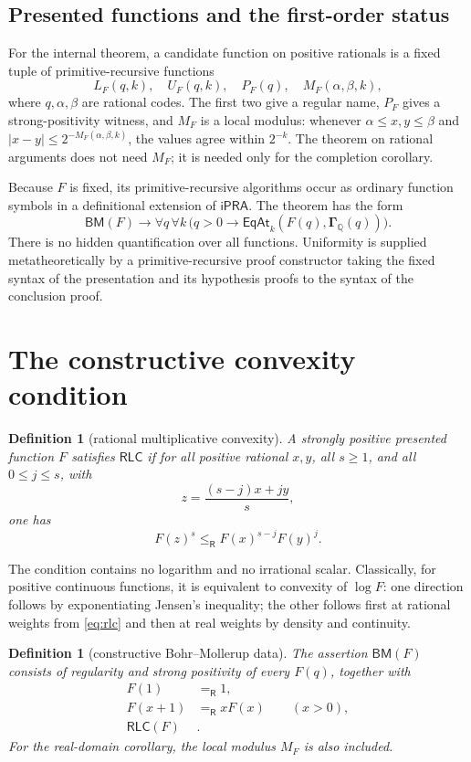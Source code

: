 \documentclass[11pt]{article}
\newtheorem{definition}[theorem]{Definition}
\newcommand{\Q}{\mathbb Q}
\newcommand{\ipra}{\mathsf{iPRA}}
\newcommand{\Gam}{\boldsymbol\Gamma}
\newcommand{\Eq}{\mathrel{=_{\!\mathsf R}}}
\newcommand{\Le}{\mathrel{\le_{\!\mathsf R}}}
\newcommand{\RLC}{\mathsf{RLC}}
\newcommand{\BM}{\mathsf{BM}}
\newcommand{\abs}[1]{\left|#1\right|}
\begin{document}
\subsection{Presented functions and the first-order status}

For the internal theorem, a candidate function on positive rationals is a
fixed tuple of primitive-recursive functions
\[
 L_F(q,k),\quad U_F(q,k),\quad P_F(q),\quad M_F(\alpha,\beta,k),
\]
where $q,\alpha,\beta$ are rational codes.  The first two give a regular name,
$P_F$ gives a strong-positivity witness, and $M_F$ is a local modulus:
whenever $\alpha\le x,y\le\beta$ and
$\abs{x-y}\le2^{-M_F(\alpha,\beta,k)}$, the values agree within $2^{-k}$.
The theorem on rational arguments does not need $M_F$; it is needed only for
the completion corollary.

Because $F$ is fixed, its primitive-recursive algorithms occur as ordinary
function symbols in a definitional extension of $\ipra$.  The theorem has the
form
\[
 \BM(F)\longrightarrow
 \forall q\,\forall k\,
 \bigl(q>0\longrightarrow \mathsf{EqAt}_k(F(q),\Gam_{\Q}(q))\bigr).
 \label{eq:schema-shape}
\]
There is no hidden quantification over all functions.  Uniformity is supplied
metatheoretically by a primitive-recursive proof constructor taking the fixed
syntax of the presentation and its hypothesis proofs to the syntax of the
conclusion proof.

\section{The constructive convexity condition}

\begin{definition}[rational multiplicative convexity]
A strongly positive presented function $F$ satisfies $\RLC$ if for all
positive rational $x,y$, all $s\ge1$, and all $0\le j\le s$, with
\[
 z=\frac{(s-j)x+jy}{s},
\]
one has
\begin{equation}
 F(z)^s\Le F(x)^{s-j}F(y)^j.
 \label{eq:rlc}
\end{equation}
\end{definition}

The condition contains no logarithm and no irrational scalar.  Classically,
for positive continuous functions, it is equivalent to convexity of
$\log F$: one direction follows by exponentiating Jensen's inequality; the
other follows first at rational weights from \eqref{eq:rlc} and then at real
weights by density and continuity.

\begin{definition}[constructive Bohr--Mollerup data]
The assertion $\BM(F)$ consists of regularity and strong positivity of every
$F(q)$, together with
\begin{align}
 F(1)&\Eq1, \label{eq:normalization}\\
 F(x+1)&\Eq xF(x) \qquad(x>0), \label{eq:recurrence}\\
 \RLC(F)&. \label{eq:convexity-assumption}
\end{align}
For the real-domain corollary, the local modulus $M_F$ is also included.
\end{definition}
\end{document}
